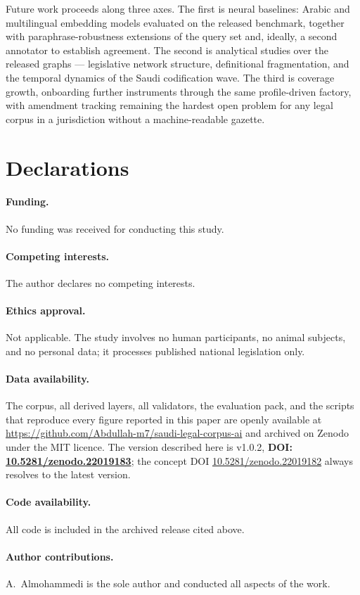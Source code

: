 \documentclass[sn-basic]{sn-jnl}%
\begin{document}
Future work proceeds along three axes. The first is neural baselines:
Arabic and multilingual embedding models evaluated on the released
benchmark, together with paraphrase-robustness extensions of the query set
and, ideally, a second annotator to establish agreement. The second is
analytical studies over the released graphs --- legislative network
structure, definitional fragmentation, and the temporal dynamics of the
Saudi codification wave. The third is coverage growth, onboarding further
instruments through the same profile-driven factory, with amendment
tracking remaining the hardest open problem for any legal corpus in a
jurisdiction without a machine-readable gazette.

\section*{Declarations}

\paragraph{Funding.} No funding was received for conducting this study.

\paragraph{Competing interests.} The author declares no competing interests.

\paragraph{Ethics approval.} Not applicable. The study involves no human
participants, no animal subjects, and no personal data; it processes
published national legislation only.

\paragraph{Data availability.} The corpus, all derived layers, all
validators, the evaluation pack, and the scripts that reproduce every figure
reported in this paper are openly available at
\url{https://github.com/Abdullah-m7/saudi-legal-corpus-ai} and archived on
Zenodo under the MIT licence. The version described here is v1.0.2,
\textbf{DOI: \href{https://doi.org/10.5281/zenodo.22019183}{10.5281/zenodo.22019183}};
the concept DOI
\href{https://doi.org/10.5281/zenodo.22019182}{10.5281/zenodo.22019182}
always resolves to the latest version.

\paragraph{Code availability.} All code is included in the archived release
cited above.

\paragraph{Author contributions.} A.~Almohammedi is the sole author and
conducted all aspects of the work.



\end{document}

